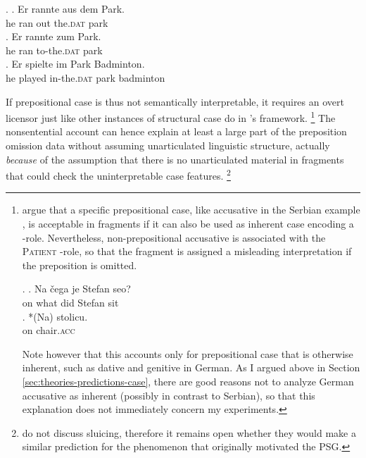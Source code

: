 \ex. \ag. Er rannte aus dem Park.\\
he ran  out the.\textsc{dat} park\\
  
\bg. Er rannte zum Park.\\
he ran to-the.\textsc{dat} park\\
 
\cg. Er spielte im Park Badminton.\\
he played in-the.\textsc{dat} park badminton\\

If prepositional case is thus not semantically interpretable, it requires an overt licensor just like other instances of structural case do in \citeauthor{barton.progovac2005}'s framework.%
%
\footnote{\citet[342]{progovac.etal2006} argue that a specific prepositional case, like accusative in the Serbian example \Next, is acceptable in fragments if it can also be used as inherent case encoding a \texttheta-role. Nevertheless, non-prepositional accusative is associated with the \textsc{Patient} \texttheta-role, so that the fragment is assigned a misleading interpretation if the preposition is omitted. 

\ex. \ag. Na čega je Stefan seo?\\
	      on what did Stefan sit\\
	       
	 \bg. *(Na) stolicu.\\
	      on chair.\textsc{acc}\\
	      
Note however that this accounts only for prepositional case that is otherwise inherent, such as dative and genitive in German. As I argued above in Section \ref{sec:theories-predictions-case}, there are good reasons not to analyze German accusative as inherent (possibly in contrast to Serbian), so that this explanation does not immediately concern my experiments.}\afterfn%
%
The nonsentential account can hence explain at least a large part of the preposition omission data without assuming unarticulated linguistic structure, actually \textit{because} of the assumption that there is no unarticulated material in fragments that could check the uninterpretable case features.%
% 
\footnote{\citet{barton.progovac2005} do not discuss sluicing, therefore it remains open whether they would make a similar prediction for the phenomenon that originally motivated the PSG.}\afterfn%
%

